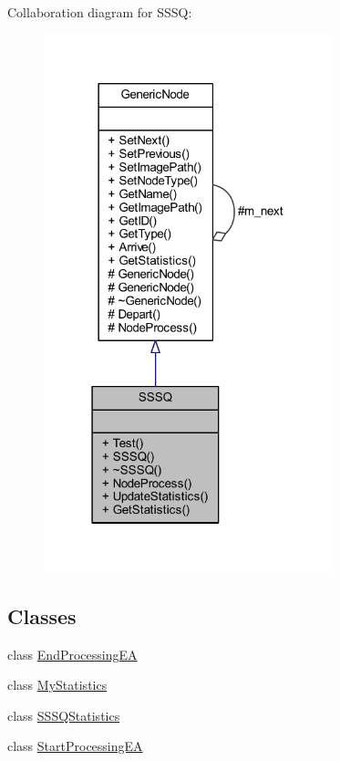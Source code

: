 Collaboration diagram for S\+S\+SQ\+:
\nopagebreak
\begin{figure}[H]
\begin{center}
\leavevmode
\includegraphics[width=238pt]{class_s_s_s_q__coll__graph}
\end{center}
\end{figure}
\subsection*{Classes}
\begin{DoxyCompactItemize}
\item 
class \hyperlink{class_s_s_s_q_1_1_end_processing_e_a}{End\+Processing\+EA}
\item 
class \hyperlink{class_s_s_s_q_1_1_my_statistics}{My\+Statistics}
\item 
class \hyperlink{class_s_s_s_q_1_1_s_s_s_q_statistics}{S\+S\+S\+Q\+Statistics}
\item 
class \hyperlink{class_s_s_s_q_1_1_start_processing_e_a}{Start\+Processing\+EA}
\end{DoxyCompactItemize}
